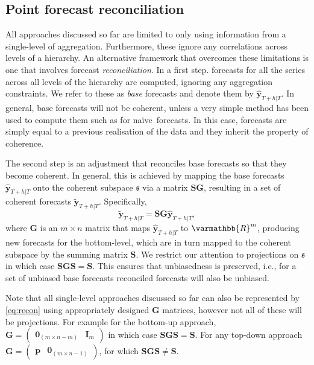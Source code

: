 \documentclass[graybox]{svmult}
\def\naive{na\"{i}ve\ }
\begin{document}
\subsection{Point forecast reconciliation}\label{sec:reconciliation approaches}

All approaches discussed so far are limited to only using information from a single-level of aggregation. Furthermore, these ignore any correlations across levels of a hierarchy. An alternative framework that overcomes these limitations is one that involves forecast \textit{reconciliation}. In a first step. forecasts for all the series across all levels of the hierarchy are computed, ignoring any aggregation constraints. We refer to these as \textit{base} forecasts and denote them by $\hat{\bm{y}}_{T+h|T}$. In general, base forecasts will not be coherent, unless a very simple method has been used to compute them such as for \naive forecasts. In this case, forecasts are simply equal to a previous realisation of the data and they inherit the property of coherence.

The second step is an adjustment that reconciles base forecasts so that they become coherent. In general, this is achieved by mapping the base forecasts $\hat{\bm{y}}_{T+h|T}$ onto the coherent subspace $\mathfrak{s}$ via a matrix $\bm{SG}$, resulting in a set of coherent forecasts $\tilde{\bm{y}}_{T+h|T}$. Specifically,
\begin{equation}\label{eq:recon}
	\tilde{\bm{y}}_{T+h|T}=\bm{S}\bm{G}\hat{\bm{y}}_{T+h|T},
\end{equation}
where $\bm{G}$ is an $m\times n$ matrix that maps $\hat{\bm{y}}_{T+h|T}$ to $\varmathbb{R}^m$, producing new forecasts for the bottom-level, which are in turn mapped to the coherent subspace by the summing matrix $\bm{S}$. We restrict our attention to projections on $\mathfrak{s}$ in which case $\bm{S}\bm{G}\bm{S}=\bm{S}$. This ensures that unbiasedness is preserved, i.e., for a set of unbiased base forecasts reconciled forecasts will also be unbiased.

Note that all single-level approaches discussed so far can also be represented by \eqref{eq:recon} using appropriately designed $\bm{G}$ matrices, however not all of these will be projections. For example for the bottom-up approach, $\bm{G}=\begin{pmatrix}
		\bm{0}_{(m \times n-m)} & \bm{I}_m
	\end{pmatrix}$ in which case $\bm{S}\bm{G}\bm{S}=\bm{S}$. For any top-down approach
$\bm{G}=\begin{pmatrix}
		\bm{p} & \bm{0}_{(m \times n-1)}
	\end{pmatrix}$, for which $\bm{S}\bm{G}\bm{S}\ne\bm{S}$.
\end{document}
